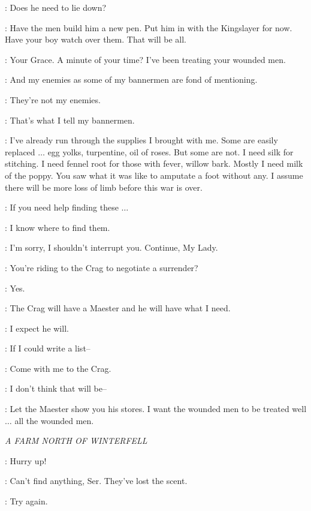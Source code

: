 \KARSTARK: Does he need to lie down?

\ROBB: Have the men build him a new pen. Put him in with the Kingslayer for now. Have your boy watch over them. That will be all.


\TALISA: Your Grace. A minute of your time? I've been treating your wounded men.

\ROBB: And my enemies as some of my bannermen are fond of mentioning.

\TALISA: They're not my enemies.

\ROBB: That's what I tell my bannermen.

\TALISA: I've already run through the supplies I brought with me. Some are easily replaced $\ldots$ egg yolks, turpentine, oil of roses. But some are not. I need silk for stitching. I need fennel root for those with fever, willow bark. Mostly I need milk of the poppy. You saw what it was like to amputate a foot without any. I assume there will be more loss of limb before this war is over.

\ROBB: If you need help finding these $\ldots$

\TALISA: I know where to find them.

\ROBB: I'm sorry, I shouldn't interrupt you. Continue, My Lady.

\TALISA: You're riding to the Crag to negotiate a surrender?

\ROBB: Yes.

\TALISA: The Crag will have a Maester and he will have what I need.

\ROBB: I expect he will.

\TALISA: If I could write a list--

\ROBB: Come with me to the Crag.

\TALISA: I don't think that will be--

\ROBB: Let the Maester show you his stores. I want the wounded men to be treated well $\ldots$ all the wounded men.


\scene

\textit{A FARM NORTH OF WINTERFELL}


\THEON: Hurry up!

\DAGMER: Can't find anything, Ser. They've lost the scent.

\THEON: Try again.

